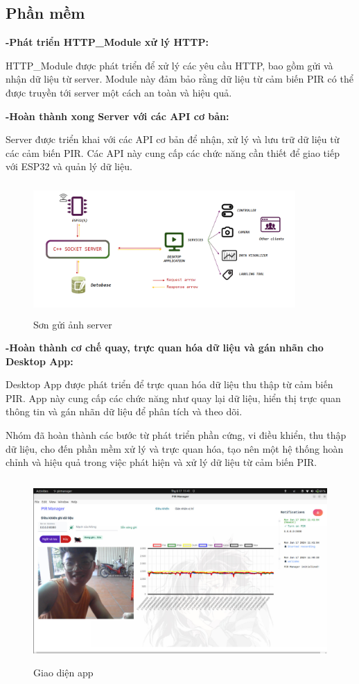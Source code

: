 \documentclass{article}
\begin{document}
\subsection{Phần mềm}
\textbf{-Phát triển HTTP\_Module xử lý HTTP:}

HTTP\_Module được phát triển để xử lý các yêu cầu HTTP, bao gồm gửi và nhận dữ liệu từ server. Module này đảm bảo rằng dữ liệu từ cảm biến PIR có thể được truyền tới server một cách an toàn và hiệu quả.

\textbf{-Hoàn thành xong Server với các API cơ bản:}

Server được triển khai với các API cơ bản để nhận, xử lý và lưu trữ dữ liệu từ các cảm biến PIR. Các API này cung cấp các chức năng cần thiết để giao tiếp với ESP32 và quản lý dữ liệu.
\begin{figure}[H]
    \centering
    \includegraphics[width=10cm,height=5cm]{image/anh4.png}
    \caption{Sơn gửi ảnh server} \label{EV}
\end{figure}
\textbf{-Hoàn thành cơ chế quay, trực quan hóa dữ liệu và gán nhãn cho Desktop App:}


Desktop App được phát triển để trực quan hóa dữ liệu thu thập từ cảm biến PIR. App này cung cấp các chức năng như quay lại dữ liệu, hiển thị trực quan thông tin và gán nhãn dữ liệu để phân tích và theo dõi.

Nhóm đã hoàn thành các bước từ phát triển phần cứng, vi điều khiển, thu thập dữ liệu, cho đến phần mềm xử lý và trực quan hóa, tạo nên một hệ thống hoàn chỉnh và hiệu quả trong việc phát hiện và xử lý dữ liệu từ cảm biến PIR.
\begin{figure}[H]
    \centering
    \includegraphics[width=12cm,height=7cm]{image/anh11.png}
    \caption{Giao diện app} \label{EV}
\end{figure}
\end{document}
